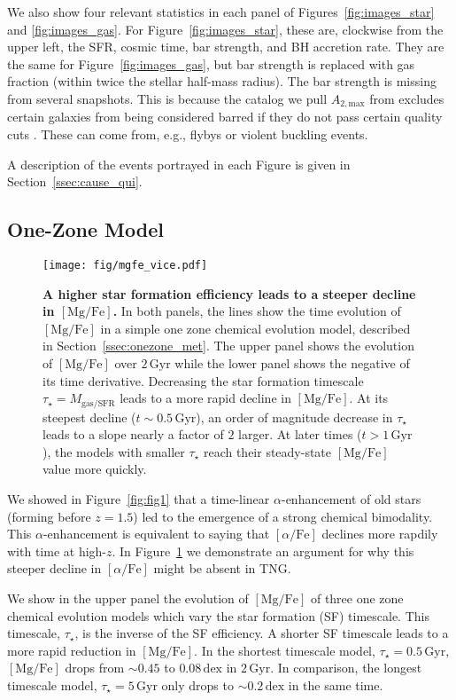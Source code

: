 \documentclass[linenumbers, twocolumn]{aastex631}
\newcommand{\Gyr}{\ensuremath{\textrm{Gyr}}}
\newcommand{\MgFe}{\ensuremath{[\textrm{Mg}/\textrm{Fe}]}}
\newcommand{\alphaFe}{\ensuremath{[\alpha/\textrm{Fe}]}}
\newcommand{\dex}{\ensuremath{\textrm{dex}}}
\newcommand{\Atmax}{\ensuremath{A_{2,\textrm{max}}}}
\begin{document}
We also show four relevant statistics in each panel of Figures~\ref{fig:images_star} and \ref{fig:images_gas}. For Figure~\ref{fig:images_star}, these are, clockwise from the upper left, the SFR, cosmic time, bar strength, and BH accretion rate. They are the same for Figure~\ref{fig:images_gas}, but bar strength is replaced with gas fraction (within twice the stellar half-mass radius). The bar strength is missing from several snapshots. This is because the catalog we pull \Atmax{} from excludes certain galaxies from being considered barred if they do not pass certain quality cuts \citep{2022MNRAS.515.1524Z}. These can come from, e.g., flybys or violent buckling events.

A description of the events portrayed in each Figure is given in Section~\ref{ssec:cause_qui}.

\subsection{One-Zone Model}\label{ssec:onezone}

\begin{figure}
  \centering
  \texttt{[image: fig/mgfe\_vice.pdf]}
  \caption{\textbf{A higher star formation efficiency leads to a steeper decline in \MgFe{}.} In both panels, the lines show the time evolution of \MgFe{} in a simple one zone chemical evolution model, described in Section~\ref{ssec:onezone_met}. The upper panel shows the evolution of \MgFe{} over $2\,\Gyr$ while the lower panel shows the negative of its time derivative. Decreasing the star formation timescale $\tau_{\star}=M_{\textrm{gas}/\textrm{SFR}}$ leads to a more rapid decline in \MgFe{}. At its steepest decline ($t\sim0.5\,\Gyr$), an order of magnitude decrease in $\tau_{\star}$ leads to a slope nearly a factor of $2$ larger. At later times ($t>1\,\Gyr$), the models with smaller $\tau_{\star}$ reach their steady-state \MgFe{} value more quickly.}
  \label{fig:vice}
\end{figure}

We showed in Figure~\ref{fig:fig1} that a time-linear $\alpha$-enhancement of old stars (forming before $z=1.5$) led to the emergence of a strong chemical bimodality. This $\alpha$-enhancement is equivalent to saying that \alphaFe{} declines more rapdily with time at high-$z$. In Figure~\ref{fig:vice} we demonstrate an argument for why this steeper decline in \alphaFe{} might be absent in TNG.

We show in the upper panel the evolution of \MgFe{} of three one zone chemical evolution models which vary the star formation (SF) timescale. This timescale, $\tau_{\star}$, is the inverse of the SF efficiency. A shorter SF timescale leads to a more rapid reduction in \MgFe{}. In the shortest timescale model, $\tau_{\star}=0.5\,\Gyr$, \MgFe{} drops from $\sim0.45$ to $0.08\,\dex$ in $2\,\Gyr$. In comparison, the longest timescale model, $\tau_{\star}=5\,\Gyr$ only drops to $\sim0.2\,\dex$ in the same time.
\end{document}
